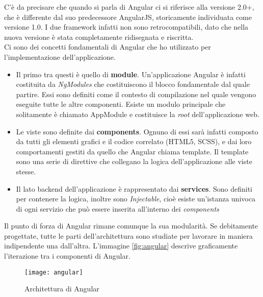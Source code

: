 C'è da precisare che quando si parla di Angular ci si riferisce alla versione 2.0+, che è differente dal suo predecessore AngularJS,
storicamente individuata come versione 1.0. I due framework infatti non sono retrocompatibili, dato che nella nuova versione è stata
completamente ridisegnata e riscritta. \\
\noindent Ci sono dei concetti fondamentali di Angular che ho utilizzato per l'implementazione
dell'applicazione.
\begin{itemize}
  \item Il primo tra questi è quello di \textbf{module}. Un'applicazione Angular è infatti costituita da \textit{NgModules} che
  costituiscono il blocco fondamentale dal quale partire. Essi sono definiti come il contesto di compilazione nel quale vengono eseguite
  tutte le altre componenti. Esiste un modulo principale che solitamente è chiamato AppModule e costituisce la \textit{root} dell'applicazione web.
  \item Le viste sono definite dai \textbf{components}. Ognuno di essi sarà infatti composto da tutti gli elementi grafici e il codice
  correlato (HTML5, SCSS), e dai loro comportamenti gestiti da quello che Angular chiama template. Il template sono una serie di direttive
  che collegano la logica dell'applicazione alle viste stesse.
  \item  Il lato \gls{backend} dell'applicazione è rappresentato dai \textbf{services}. Sono definiti per contenere la logica, inoltre sono
  \textit{Injectable}, cioè esiste un'istanza univoca di ogni servizio che può essere inserita all'interno dei \textit{components} 
\end{itemize}

Il punto di forza di Angular rimane comunque la sua modularità. Se debitamente progettate, tutte le parti dell'architettura sono studiate
per lavorare in maniera indipendente una dall'altra. 
L'immagine \autoref{fig:angular} descrive graficamente l'iterazione tra i componenti di Angular. 

\begin{figure}[h]
  \texttt{[image: angular]} 
  \caption{Architettura di Angular}
  \label{fig:angular}
\end{figure}

